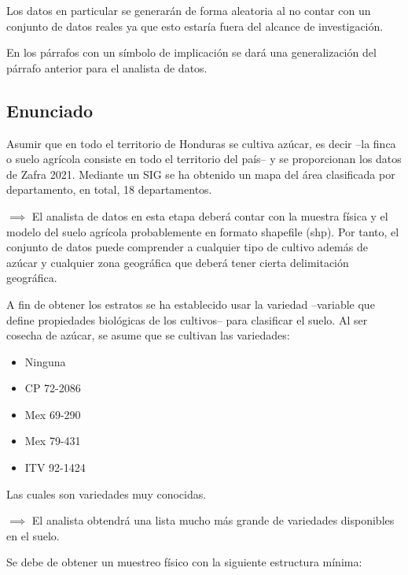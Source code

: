 \documentclass{article}
\begin{document}
\bigbreak

Los datos en particular se generarán de forma aleatoria al no contar con un conjunto de datos reales ya que esto estaría fuera del alcance de investigación.

\bigbreak

En los párrafos con un símbolo de implicación se dará una generalización del párrafo anterior para el analista de datos.

\subsection{Enunciado}

Asumir que en todo el territorio de Honduras se cultiva azúcar, es decir --la finca o suelo agrícola consiste en todo el territorio del país-- y se proporcionan los datos de Zafra 2021. Mediante un SIG se ha obtenido un mapa del área clasificada por departamento, en total, 18 departamentos.

\bigbreak

$\implies$ El analista de datos en esta etapa deberá contar con la muestra física y el modelo del suelo agrícola probablemente en formato shapefile (shp). Por tanto, el conjunto de datos puede comprender a cualquier tipo de  cultivo además de azúcar y cualquier zona geográfica que deberá tener
cierta delimitación geográfica.

\bigbreak

A fin de obtener los estratos se ha establecido usar la variedad --variable que define propiedades biológicas de los cultivos-- para clasificar el suelo. Al ser cosecha de azúcar, se asume que se cultivan las variedades:

\begin{itemize}
    \item Ninguna
    \item CP 72-2086
    \item Mex 69-290
    \item Mex 79-431
    \item ITV 92-1424
\end{itemize}

Las cuales son variedades muy conocidas.

\bigbreak

$\implies$ El analista obtendrá una lista mucho más grande de variedades disponibles en el suelo.

\bigbreak

Se debe de obtener un muestreo físico con la siguiente estructura mínima:
\end{document}
